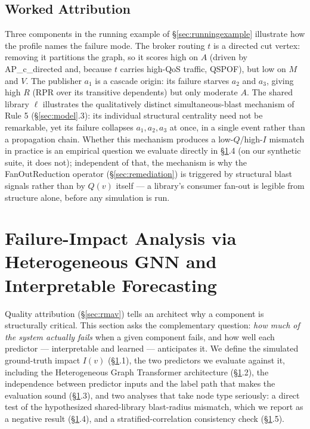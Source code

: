 \documentclass[review]{elsarticle}
\begin{document}
\subsection{Worked Attribution}

Three components in the running example of \S\ref{sec:runningexample} illustrate how the profile
names the failure mode. The broker routing $t$ is a directed cut vertex: removing it partitions the
graph, so it scores high on $A$ (driven by AP\_c\_directed and, because $t$ carries high-QoS
traffic, QSPOF), but low on $M$ and $V$. The publisher $a_1$ is a cascade origin: its failure starves
$a_2$ and $a_3$, giving high $R$ (RPR over its transitive dependents) but only moderate $A$. The
shared library $\ell$ illustrates the qualitatively distinct simultaneous-blast mechanism of Rule 5
(\S\ref{sec:model}.3): its individual structural centrality need not be remarkable, yet its failure
collapses $a_1, a_2, a_3$ at once, in a single event rather than a propagation chain. Whether this
mechanism produces a low-$Q$/high-$I$ mismatch in practice is an empirical question we evaluate
directly in \S\ref{sec:impact}.4 (on our synthetic suite, it does not); independent of that, the
mechanism is why the FanOutReduction operator (\S\ref{sec:remediation}) is triggered by structural
blast signals rather than by $Q(v)$ itself --- a library's consumer fan-out is legible from structure
alone, before any simulation is run.

\section{Failure-Impact Analysis via Heterogeneous GNN and Interpretable Forecasting}
\label{sec:impact}

Quality attribution (\S\ref{sec:rmav}) tells an architect why a component is structurally critical.
This section asks the complementary question: \emph{how much of the system actually fails} when a
given component fails, and how well each predictor --- interpretable and learned --- anticipates it.
We define the simulated ground-truth impact $I(v)$ (\S\ref{sec:impact}.1), the two predictors we
evaluate against it, including the Heterogeneous Graph Transformer architecture
(\S\ref{sec:impact}.2), the independence between predictor inputs and the label path that makes the
evaluation sound (\S\ref{sec:impact}.3), and two analyses that take node type seriously: a direct
test of the hypothesized shared-library blast-radius mismatch, which we report as a negative result
(\S\ref{sec:impact}.4), and a stratified-correlation consistency check (\S\ref{sec:impact}.5).
\end{document}
